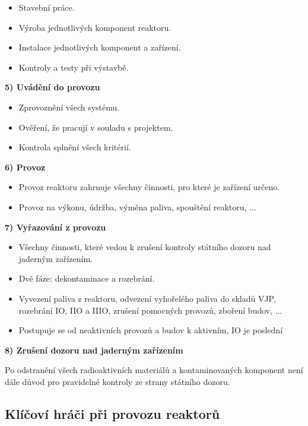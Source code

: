 \begin{itemize}
    \item Stavební práce.
    \item Výroba jednotlivých komponent reaktoru.
    \item Instalace jednotlivých komponent a zařízení.
    \item Kontroly a testy při výstavbě.
\end{itemize}

\textbf{5) Uvádění do provozu}

\begin{itemize}
    \item Zprovoznění všech systému.
    \item Ověření, že pracují v souladu s projektem.
    \item Kontrola splnění všech kritérií.
\end{itemize}
    
\textbf{6) Provoz}

\begin{itemize}
    \item Provoz reaktoru zahrnuje všechny činnosti, pro které je zařízení určeno.
    \item Provoz na výkonu, údržba, výměna paliva, spouštění reaktoru, ...
\end{itemize}

\textbf{7) Vyřazování z provozu}

\begin{itemize}
    \item Všechny činnosti, které vedou k zrušení kontroly státního dozoru nad jaderným zařízením.
    \item Dvě fáze: dekontaminace a rozebrání.
    \item Vyvezení paliva z reaktoru, odvezení vyhořelého paliva do skladů VJP, rozebrání IO, IIO a IIIO, zrušení pomocných provozů, zboření budov, ...
    \item Postupuje se od neaktivních provozů a budov k aktivním, IO je poslední
\end{itemize}

\textbf{8) Zrušení dozoru nad jaderným zařízením}

Po odstranění všech radioaktivních materiálů a kontaminovaných komponent není dále důvod pro pravidelné kontroly ze strany státního dozoru.

\subsection{Klíčoví hráči při provozu reaktorů}

